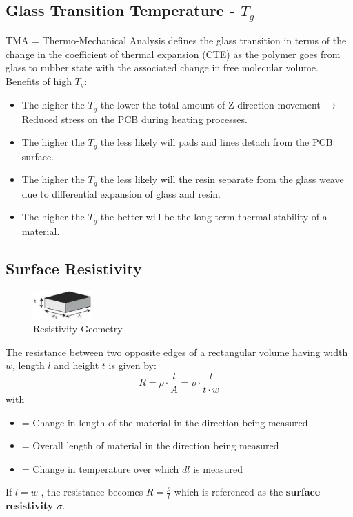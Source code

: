 	\subsection{Glass Transition Temperature - $T_g$}
		TMA = Thermo-Mechanical Analysis defines the glass transition in terms of the change in the coefficient of thermal expansion (CTE) as the polymer goes from glass to rubber state with the associated change in free molecular volume. \\
		Benefits of high $T_g$:
		\begin{itemize}
			\setlength{\itemsep}{-5pt}
			\item The higher the $T_g$ the lower the total amount of Z-direction movement $\rightarrow$ Reduced stress on the PCB during heating processes. 
			\item The higher the $T_g$ the less likely will pads and lines detach from the PCB surface. 
			\item The higher the $T_g$ the less likely will the resin separate from the glass weave due to differential expansion of glass and resin. 
			\item The higher the $T_g$ the better will be the long term thermal stability of a material. 
		\end{itemize}
			
	\subsection{Surface Resistivity}
		\begin{figure}[h]
			\centering
			\includegraphics[width=0.2\textwidth]{images/ResistivityGeometry.png}
			\caption{Resistivity Geometry}
			\label{Fig:ResGeometry}
		\end{figure}
		The resistance between two opposite edges of a rectangular volume having width $w$, length $l$ and height $t$ is given by: 
		\begin{equation}
			R = \rho \cdot \frac{l}{A} = \rho \cdot \frac{l}{t\cdot w}
		\end{equation}
		with 
		\begin{itemize}
			\setlength{\itemsep}{-5pt}
			\item[]  = Change in length of the material in the direction being measured
			\item[]  = Overall length of material in the direction being measured
			\item[]  = Change in temperature over which $dl$ is measured
		\end{itemize}
		If $l = w $ , the resistance becomes $R = \frac{\rho}{l}$ which is referenced as the \textbf{surface resistivity $\sigma$}. 
